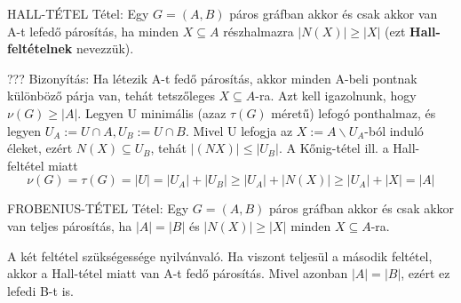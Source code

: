 \begin{tetel}{
HALL-TÉTEL Tétel}: Egy $G = (A,B)$ páros gráfban akkor és csak akkor van A-t lefedő párosítás, ha minden $X \subseteq A$ részhalmazra $|N(X)| \geq |X|$ (ezt \textbf{Hall-feltételnek} nevezzük).
\end{tetel}
\begin{leftbar}???
Bizonyítás: Ha létezik A-t fedő párosítás, akkor minden A-beli pontnak különböző párja van, tehát tetszőleges $X \subseteq A$-ra. Azt kell igazolnunk, hogy $\nu(G) \geq |A|$. Legyen U minimális (azaz $\tau(G)$ méretű) lefogó ponthalmaz, és legyen $U_A :=U\cap A,U_B:=U\cap B$. Mivel U lefogja az $X := A \backslash U_A$-ból induló éleket, ezért $N(X) \subseteq U_B$, tehát $|(NX)| \leq |U_B|$. A Kőnig-tétel ill. a Hall-feltétel miatt
$$\nu(G) = \tau(G) = |U| = |U_A| + |U_B| \geq |U_A| + |N(X)| \geq |U_A| + |X| = |A|$$
\end{leftbar}
\begin{tetel}{
FROBENIUS-TÉTEL Tétel}: Egy $G = (A,B)$ páros gráfban akkor és csak akkor van teljes párosítás, ha $|A| = |B|$ és $|N(X)| \geq |X|$ minden $X \subseteq A$-ra.
\end{tetel}
\begin{leftbar}
A két feltétel szükségessége nyilvánvaló. Ha viszont teljesül a második feltétel, akkor a Hall-tétel miatt van A-t fedő párosítás. Mivel azonban $|A| = |B|$, ezért ez lefedi B-t is.
\end{leftbar}
